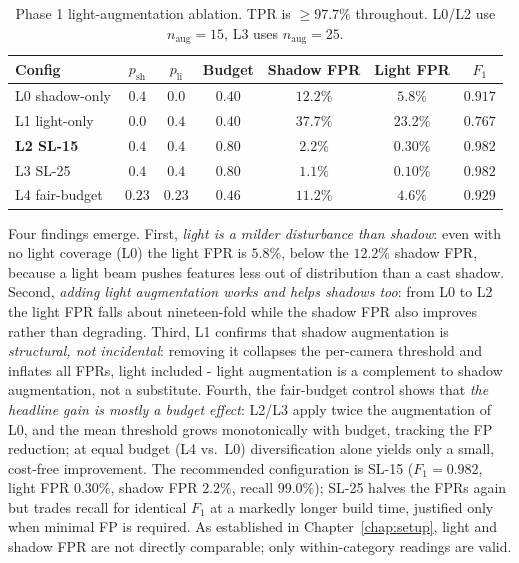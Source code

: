 \begin{table}[h]
  \centering
  \begin{tabular}{lcccccc}
    \hline
    Config & $p_{\mathrm{sh}}$ & $p_{\mathrm{li}}$ & Budget & Shadow FPR & Light FPR & $F_1$ \\
    \hline
    L0 shadow-only & $0.4$ & $0.0$ & $0.40$ & $12.2\%$ & $5.8\%$ & $0.917$ \\
    L1 light-only & $0.0$ & $0.4$ & $0.40$ & $37.7\%$ & $23.2\%$ & $0.767$ \\
    \textbf{L2 SL-15} & $0.4$ & $0.4$ & $0.80$ & $\mathbf{2.2\%}$ & $\mathbf{0.30\%}$ & $\mathbf{0.982}$ \\
    L3 SL-25 & $0.4$ & $0.4$ & $0.80$ & $1.1\%$ & $0.10\%$ & $0.982$ \\
    L4 fair-budget & $0.23$ & $0.23$ & $0.46$ & $11.2\%$ & $4.6\%$ & $0.929$ \\
    \hline
  \end{tabular}
  \caption{Phase 1 light-augmentation ablation. TPR is $\geq 97.7\%$ throughout.
  L0/L2 use $n_{\mathrm{aug}}=15$, L3 uses $n_{\mathrm{aug}}=25$.}
  \label{tab:p3-phaseE}
\end{table}

Four findings emerge. First, \emph{light is a milder disturbance than shadow}:
even with no light coverage (L0) the light FPR is $5.8\%$, below the $12.2\%$
shadow FPR, because a light beam pushes features less out of distribution than a
cast shadow. Second, \emph{adding light augmentation works and helps shadows
too}: from L0 to L2 the light FPR falls about nineteen-fold while the shadow FPR
also improves rather than degrading. Third, L1 confirms that shadow augmentation
is \emph{structural, not incidental}: removing it collapses the per-camera
threshold and inflates all FPRs, light included - light augmentation is a
complement to shadow augmentation, not a substitute. Fourth, the fair-budget
control shows that \emph{the headline gain is mostly a budget effect}: L2/L3 apply
twice the augmentation of L0, and the mean threshold grows monotonically with
budget, tracking the FP reduction; at equal budget (L4 vs.\ L0) diversification
alone yields only a small, cost-free improvement. The recommended configuration
is SL-15 ($F_1 = 0.982$, light FPR $0.30\%$, shadow FPR $2.2\%$, recall $99.0\%$);
SL-25 halves the FPRs again but trades recall for identical $F_1$ at a markedly
longer build time, justified only when minimal FP is required. As established in
Chapter~\ref{chap:setup}, light and shadow FPR are not directly comparable; only
within-category readings are valid.

